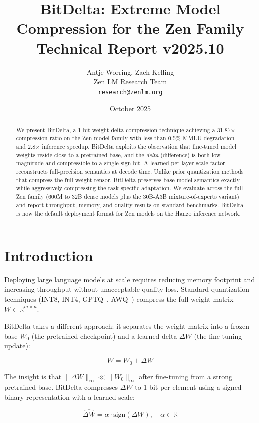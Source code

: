 \documentclass[11pt,a4paper]{article}
\title{\textbf{BitDelta: Extreme Model Compression for the Zen Family}\\
\large Technical Report v2025.10}
\author{Antje Worring, Zach Kelling \\ Zen LM Research Team\\
\texttt{research@zenlm.org}}
\date{October 2025}
\begin{document}
\maketitle

\begin{abstract}
We present BitDelta, a 1-bit weight delta compression technique achieving a 31.87$\times$
compression ratio on the Zen model family with less than 0.5\% MMLU degradation and
2.8$\times$ inference speedup. BitDelta exploits the observation that fine-tuned model
weights reside close to a pretrained base, and the \emph{delta} (difference) is both
low-magnitude and compressible to a single sign bit. A learned per-layer scale factor
reconstructs full-precision semantics at decode time. Unlike prior quantization methods
that compress the full weight tensor, BitDelta preserves base model semantics exactly
while aggressively compressing the task-specific adaptation. We evaluate across the full
Zen family (600M to 32B dense models plus the 30B-A3B mixture-of-experts variant) and
report throughput, memory, and quality results on standard benchmarks. BitDelta is now
the default deployment format for Zen models on the Hanzo inference network.
\end{abstract}

\section{Introduction}

Deploying large language models at scale requires reducing memory footprint and
increasing throughput without unacceptable quality loss. Standard quantization
techniques (INT8, INT4, GPTQ~\cite{frantar2022gptq}, AWQ~\cite{lin2023awq})
compress the full weight matrix $W \in \mathbb{R}^{m \times n}$.

BitDelta takes a different approach: it separates the weight matrix into a frozen
base $W_0$ (the pretrained checkpoint) and a learned delta $\Delta W$ (the
fine-tuning update):

\begin{equation}
W = W_0 + \Delta W
\end{equation}

The insight is that $\|\Delta W\|_\infty \ll \|W_0\|_\infty$ after fine-tuning from
a strong pretrained base. BitDelta compresses $\Delta W$ to 1 bit per element using
a signed binary representation with a learned scale:

\begin{equation}
\hat{\Delta W} = \alpha \cdot \text{sign}(\Delta W), \quad \alpha \in \mathbb{R}
\end{equation}
\end{document}
